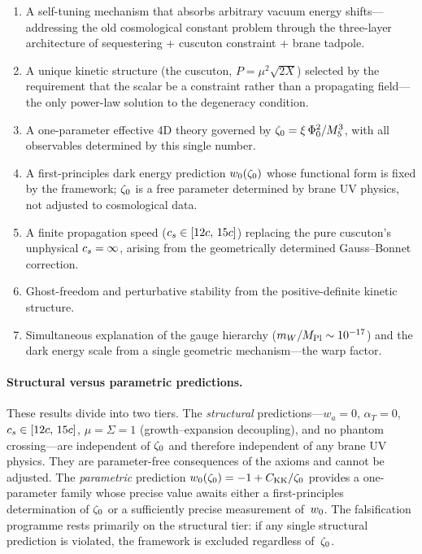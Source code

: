 \begin{enumerate}
\item A self-tuning mechanism that absorbs arbitrary vacuum energy shifts---addressing the old cosmological constant problem through the three-layer architecture of sequestering + cuscuton constraint + brane tadpole.

\item A unique kinetic structure (the cuscuton, $P = \mu^2\sqrt{2X}$) selected by the requirement that the scalar be a constraint rather than a propagating field---the only power-law solution to the degeneracy condition.

\item A one-parameter effective 4D theory governed by $\zeta_0 = \xi\,\Phi_0^2/M_5^3$, with all observables determined by this single number.

\item A first-principles dark energy prediction $w_0(\zeta_0)$ whose functional form is fixed by the framework; $\zeta_0$ is a free parameter determined by brane UV physics, not adjusted to cosmological data.

\item A finite propagation speed ($c_s \in [12c,\, 15c]$) replacing the pure cuscuton's unphysical $c_s = \infty$, arising from the geometrically determined Gauss--Bonnet correction.

\item Ghost-freedom and perturbative stability from the positive-definite kinetic structure.

\item Simultaneous explanation of the gauge hierarchy ($m_W/M_{\mathrm{Pl}} \sim 10^{-17}$) and the dark energy scale from a single geometric mechanism---the warp factor.
\end{enumerate}

\paragraph{Structural versus parametric predictions.}
These results divide into two tiers. The \emph{structural} predictions---$w_a = 0$, $\alpha_T = 0$, $c_s \in [12c,\, 15c]$, $\mu = \Sigma = 1$ (growth--expansion decoupling), and no phantom crossing---are independent of $\zeta_0$ and therefore independent of any brane UV physics. They are parameter-free consequences of the axioms and cannot be adjusted. The \emph{parametric} prediction $w_0(\zeta_0) = -1 + C_{\mathrm{KK}}/\zeta_0$ provides a one-parameter family whose precise value awaits either a first-principles determination of $\zeta_0$ or a sufficiently precise measurement of~$w_0$. The falsification programme rests primarily on the structural tier: if any single structural prediction is violated, the framework is excluded regardless of~$\zeta_0$.

